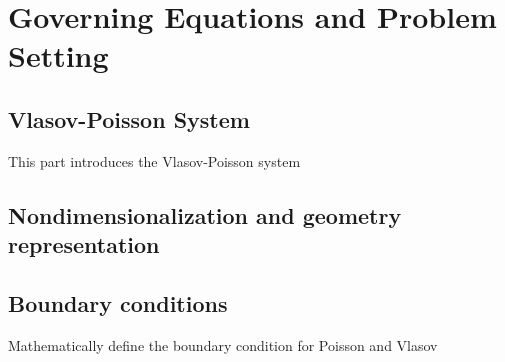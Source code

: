 \section{Governing Equations and Problem Setting}
\subsection{Vlasov-Poisson System}
This part introduces the Vlasov-Poisson system

\subsection{Nondimensionalization and geometry representation}

\subsection{Boundary conditions}
Mathematically define the boundary condition for Poisson and Vlasov
